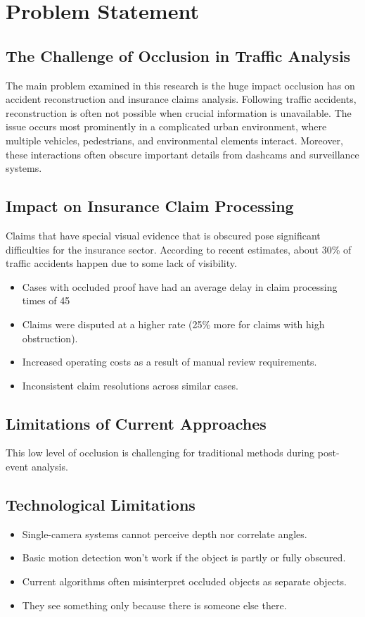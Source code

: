 \documentclass[12pt,a4paper]{report}
\theoremstyle{definition}
\theoremstyle{remark}
\begin{document}
\section{Problem Statement}

\subsection{The Challenge of Occlusion in Traffic Analysis}
The main problem examined in this research is the huge impact occlusion has on accident reconstruction and insurance claims analysis. Following traffic accidents, reconstruction is often not possible when crucial information is unavailable. The issue occurs most prominently in a complicated urban environment, where multiple vehicles, pedestrians, and environmental elements interact. Moreover, these interactions often obscure important details from dashcams and surveillance systems.

\subsection{Impact on Insurance Claim Processing}
Claims that have special visual evidence that is obscured pose significant difficulties for the insurance sector. According to recent estimates, about 30\% of traffic accidents happen due to some lack of visibility.
\begin{itemize}
    \item Cases with occluded proof have had an average delay in claim processing times of 45%
    \item Claims were disputed at a higher rate (25\% more for claims with high obstruction).
    \item Increased operating costs as a result of manual review requirements.
    \item Inconsistent claim resolutions across similar cases.
\end{itemize}

\subsection{Limitations of Current Approaches}
This low level of occlusion is challenging for traditional methods during post-event analysis.

\subsection{Technological Limitations}
\begin{itemize}
    \item Single-camera systems cannot perceive depth nor correlate angles.
    \item Basic motion detection won't work if the object is partly or fully obscured.
    \item Current algorithms often misinterpret occluded objects as separate objects.
    \item They see something only because there is someone else there.
\end{itemize}
\end{document}
